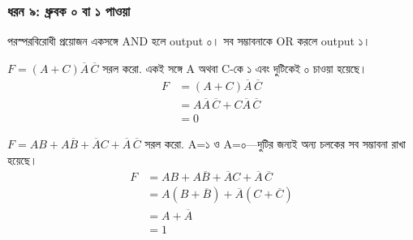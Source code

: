 \subsubsection*{ধরন ৯: ধ্রুবক ০ বা ১ পাওয়া}
পরস্পরবিরোধী প্রয়োজন একসঙ্গে AND হলে output ০। সব সম্ভাবনাকে OR করলে output ১।
\par\smallskip\noindent\begin{minipage}{\linewidth}
$F=(A+C)\overline A\,\overline C$ সরল করো.
\chThreeAnswer একই সঙ্গে A অথবা C-কে ১ এবং দুটিকেই ০ চাওয়া হয়েছে।
\[\begin{aligned}F&=(A+C)\overline A\,\overline C\\
&=A\overline A\,\overline C+C\overline A\,\overline C\\
&=0\end{aligned}\]

\end{minipage}\par\smallskip
\par\smallskip\noindent\begin{minipage}{\linewidth}
$F=AB+A\overline B+\overline AC+\overline A\,\overline C$ সরল করো.
\chThreeAnswer A=১ ও A=০—দুটির জন্যই অন্য চলকের সব সম্ভাবনা রাখা হয়েছে।
\[\begin{aligned}F&=AB+A\overline B+\overline AC+\overline A\,\overline C\\
&=A(B+\overline B)+\overline A(C+\overline C)\\
&=A+\overline A\\
&=1\end{aligned}\]

\end{minipage}\par\smallskip
{}
